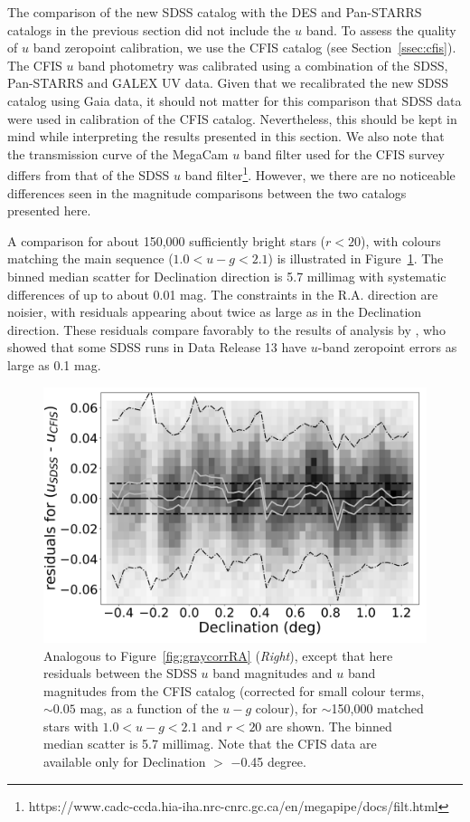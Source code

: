 \documentclass[fleqn,usenatbib]{mnras}
\begin{document}
The comparison of the new SDSS catalog with the DES and Pan-STARRS catalogs in the previous
section did not include the $u$ band. To assess the quality of $u$ band zeropoint calibration, 
we use the CFIS catalog (see Section~\ref{ssec:cfis}). The CFIS $u$ band photometry was 
calibrated using a combination of the SDSS, Pan-STARRS and GALEX UV data. Given that
we recalibrated the new SDSS catalog using Gaia data, it should not matter for this comparison that SDSS data were used in calibration of the CFIS catalog. Nevertheless, this should be kept in mind while interpreting the results presented in this section.  We also note that the transmission curve of the MegaCam $u$ band filter used for the CFIS survey differs from that of the SDSS $u$ band filter\footnote{https://www.cadc-ccda.hia-iha.nrc-cnrc.gc.ca/en/megapipe/docs/filt.html}. However, we there are no noticeable differences seen in the magnitude comparisons between the two catalogs presented here. 

A comparison for about 150,000 sufficiently bright stars ($r<20$), with colours matching the main sequence ($1.0 <u-g < 2.1$)  is illustrated in Figure~\ref{fig:CFIS}. The binned median scatter for Declination direction is 
5.7 millimag with systematic differences of up to about 0.01 mag. The constraints in the R.A. direction 
are noisier, with residuals appearing about twice as large as in the Declination direction. 
These residuals compare favorably to the results of analysis by \cite{2017ApJ...848..128I}, 
who showed that some SDSS runs in Data Release 13 have $u$-band zeropoint errors as large
as 0.1 mag. 

 
\begin{figure}
    \centering\includegraphics[width=0.95\columnwidth]{figures/colorResidCFISug_Dec_Hess.png} 
\caption{Analogous to Figure~\ref{fig:graycorrRA} ({\it Right}), except that here residuals 
between the SDSS $u$ band magnitudes and $u$ band magnitudes from the CFIS
catalog (corrected for small colour terms, $\sim0.05$ mag, as a function of the $u-g$ colour),
for $\sim$150,000 matched stars with $1.0 <u-g < 2.1$ and $r<20$ are shown. 
The binned median scatter is 5.7 millimag. Note that the CFIS data are available
only for Declination $>$ $-$0.45 degree.}
\label{fig:CFIS}
\end{figure}
\end{document}

